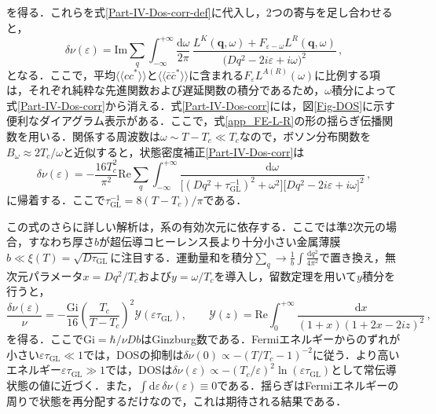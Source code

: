 \documentclass[a4paper,11pt]{ltjsarticle}
\def\d{\mathrm{d}}
\def\qo{(\mathbf{q},\omega)}
\begin{document}
を得る．これらを式\eqref{Part-IV-Dos-corr-def}に代入し，2つの寄与を足し合わせると，
\begin{equation}\label{Part-IV-Dos-corr}
\delta\nu(\varepsilon)=\mathrm{Im}\sum_{q}
\int^{+\infty}_{-\infty}\frac{\d\omega}{2\pi}\,
\frac{L^{K}\qo+F_{\varepsilon-\omega}L^{R}\qo}
{\big(Dq^{2}-2i\varepsilon+i\omega\big)^{2}}\,,
\end{equation}
となる．ここで，平均$\langle\langle cc^{*}\rangle\rangle$と$\langle\langle\bar{c}\bar{c}^{*}\rangle\rangle$に含まれる$F_{\varepsilon}L^{A(R)}(\omega)$に比例する項は，それぞれ純粋な先進関数および遅延関数の積分であるため，$\omega$積分によって式\eqref{Part-IV-Dos-corr}から消える．式\eqref{Part-IV-Dos-corr}には，図\ref{Fig-DOS}に示す便利なダイアグラム表示がある．ここで，式\eqref{app_FE-L-R}の形の揺らぎ伝播関数を用いる．関係する周波数は$\omega\sim T-T_c\ll T_c$なので，ボソン分布関数を$B_{\omega}\approx 2T_{c}/\omega$と近似すると，状態密度補正\eqref{Part-IV-Dos-corr}は
\begin{equation}\label{Part-IV-Dos-intermediate}
\delta\nu(\varepsilon)=-\frac{16T^{2}_{c}}{\pi^{2}}\mathrm{Re}\sum_{q}
\int^{+\infty}_{-\infty}\frac{\d\omega}
{\big[(Dq^{2}+\tau^{-1}_{\mathrm{GL}})^{2}+\omega^{2}\big]
\big[Dq^{2}-2i\varepsilon+i\omega\big]^{2}}\,,
\end{equation}
に帰着する．ここで$\tau_{\mathrm{GL}}^{-1}=8(T-T_c)/\pi$である．


この式のさらに詳しい解析は，系の有効次元に依存する．ここでは準2次元の場合，すなわち厚さ$b$が超伝導コヒーレンス長より十分小さい金属薄膜$b\ll\xi(T)=\sqrt{D\tau_{\mathrm{GL}}}$に注目する．運動量和を積分$\sum_{q}\to \frac{1}{b}\int\frac{\d q^{2}}{4\pi^2}$で置き換え，無次元パラメータ$x=Dq^{2}/T_{c}$および$y=\omega/T_{c}$を導入し，留数定理を用いて$y$積分を行うと，
\begin{equation}\label{Part-III-DOS-result}
\frac{\delta\nu(\varepsilon)}{\nu}=-\frac{\mathrm{Gi}}{16}
\left(\frac{T_{c}}{T-T_{c}}\right)^{2}\mathcal{Y}(\varepsilon\tau_{\mathrm{GL}}),\qquad
\mathcal{Y}(z)=\mathrm{Re}\int^{+\infty}_{0}\frac{\d
x}{(1+x)(1+2x-2iz)^{2}}\,,
\end{equation}
を得る．ここで$\mathrm{Gi}=\hbar /\nu Db$はGinzburg数である．Fermiエネルギーからのずれが小さい$\varepsilon\tau_{\mathrm{GL}}\ll1$では，DOSの抑制は$\delta\nu(0)\propto - (T/T_{c}-1)^{-2}$に従う．より高いエネルギー$\varepsilon\tau_{\mathrm{GL}}\gg1$では，DOSは$\delta\nu(\varepsilon)\propto -(T_{c}/\varepsilon)^{2}\ln(\varepsilon\tau_{\mathrm{GL}})$として常伝導状態の値に近づく．また，$\int\d\varepsilon\,\delta\nu(\varepsilon)\equiv0$である．揺らぎはFermiエネルギーの周りで状態を再分配するだけなので，これは期待される結果である．
\end{document}
